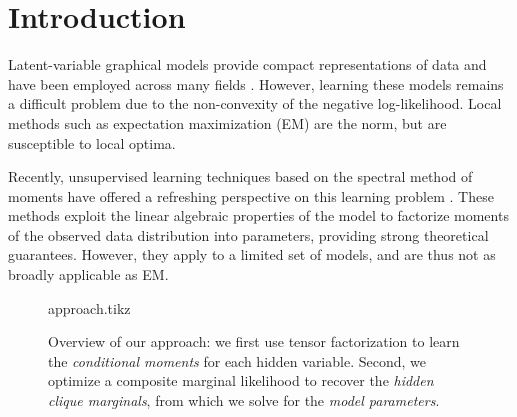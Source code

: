 \section{Introduction}
\label{sec:introduction}

Latent-variable graphical models provide compact representations of data
and have been employed across many fields %
\cite{ghahramani1999variational,jaakkola1999variational,blei03lda,quattoni04crf,beaumont2004bayesian,haghighi06prototype}.
However, learning these models remains a difficult problem due to the
non-convexity of the negative log-likelihood.  Local methods such as expectation maximization (EM)
are the norm, but are susceptible to local optima.

Recently, unsupervised learning techniques based on the spectral method of moments
have offered a refreshing perspective on
this learning problem
\citep{mossel2005learning,
hsu09spectral,
bailly2010spectral,
song2011spectral,
anandkumar11tree,
anandkumar12lda,
anandkumar12moments,
hsu12identifiability,
balle12automata}.
These methods exploit the linear algebraic properties of the model to
factorize moments of the observed data distribution into parameters,
providing strong theoretical guarantees.
However, they apply to a limited set of models, and are thus
not as broadly applicable as EM.

\begin{figure}[t]
  \label{fig:approach}
  \centering
  {approach.tikz}
  \caption{
  Overview of our approach:
  we first use tensor factorization to learn the \emph{conditional moments}
  for each hidden variable.
  Second, we optimize a composite marginal likelihood to recover the \emph{hidden clique marginals},
  from which we solve for the \emph{model parameters}.
  }
\end{figure}


